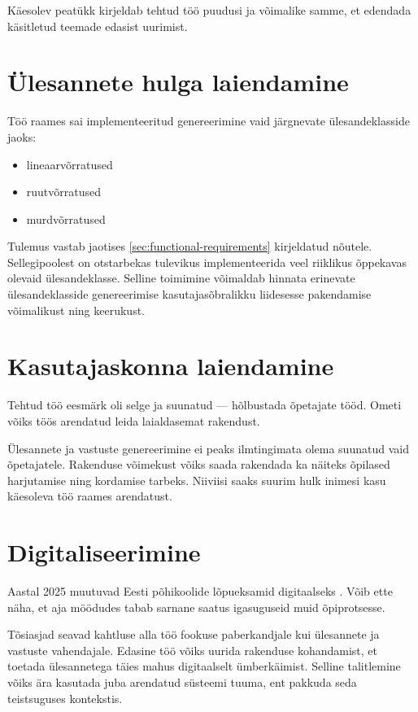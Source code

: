 Käesolev peatükk kirjeldab tehtud töö puudusi ja võimalike samme, et edendada käsitletud teemade edasist uurimist.

\section{Ülesannete hulga laiendamine}

Töö raames sai implementeeritud genereerimine vaid järgnevate ülesandeklasside jaoks:

\begin{itemize}
  \item lineaarvõrratused
  \item ruutvõrratused
  \item murdvõrratused
\end{itemize}

Tulemus vastab jaotises \ref{sec:functional-requirements} kirjeldatud nõutele. Sellegipoolest on otstarbekas tulevikus implementeerida veel riiklikus õppekavas olevaid ülesandeklasse. Selline toimimine võimaldab hinnata erinevate ülesandeklasside genereerimise kasutajasõbralikku liidesesse pakendamise võimalikust ning keerukust.

\section{Kasutajaskonna laiendamine}

Tehtud töö eesmärk oli selge ja suunatud — hõlbustada õpetajate tööd. Ometi võiks töös arendatud leida laialdasemat rakendust.

Ülesannete ja vastuste genereerimine ei peaks ilmtingimata olema suunatud vaid õpetajatele. Rakenduse võimekust võiks saada rakendada ka näiteks õpilased harjutamise ning kordamise tarbeks. Niiviisi saaks suurim hulk inimesi kasu käesoleva töö raames arendatust.
\section{Digitaliseerimine}

Aastal 2025 muutuvad Eesti põhikoolide lõpueksamid digitaalseks \cite{digital-exams}. Võib ette näha, et aja möödudes tabab sarnane saatus igasuguseid muid õpiprotsesse.

Tõsiasjad seavad kahtluse alla töö fookuse paberkandjale kui ülesannete ja vastuste vahendajale. Edasine töö võiks uurida rakenduse kohandamist, et toetada ülesannetega täies mahus digitaalselt ümberkäimist. Selline talitlemine võiks ära kasutada juba arendatud süsteemi tuuma, ent pakkuda seda teistsuguses kontekstis.

